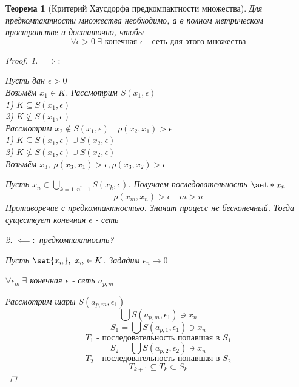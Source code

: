 \documentclass[a4paper]{article}
\DeclarePairedDelimiter\set\{\}
\newtheorem*{theorem}{Теорема}
\theoremstyle{definition}
\theoremstyle{remark}
\begin{document}
\begin{tcolorbox}[enhanced,breakable,skin first=enhanced,skin middle=enhanced,skin last=enhanced]
    \begin{theorem}[Критерий Хаусдорфа предкомпактности множества]
        Для предкомпактности множества необходимо, а в полном метрическом
        пространстве и достаточно, чтобы
        \[
            \forall \epsilon > 0 \ \exists \text{ конечная } \epsilon \text{ - сеть
            для этого множества}
        \]

        \begin{proof}
            1. $ \implies: $ 

            Пусть дан $ \epsilon > 0 $\\
            Возьмём $ x_1 \in K $. Рассмотрим $ S(x_1, \epsilon) $\\
            1) $ K \subseteq S(x_1, \epsilon) $\\
            2) $ K \not\subseteq S(x_1, \epsilon) $\\
            Рассмотрим $ x_2 \notin S(x_1, \epsilon) \quad \rho(x_2, x_1) > \epsilon $\\
            1) $ K \subseteq S(x_1, \epsilon) \cup S(x_2, \epsilon) $ \\
            2) $ K \not\subseteq S(x_1, \epsilon) \cup S(x_2, \epsilon) $ \\
            Возьмём $ x_3, \ \rho(x_3, x_1) > \epsilon, \rho(x_3, x_2) > \epsilon $

            Пусть $ x_n \in \bigcup_{k=\overline{1, n-1}} S(x_k, \epsilon) $.
            Получаем последовательность $ \set*{x_n} $ 
            \[
                \rho(x_m, x_n) > \epsilon \quad m > n
            \]
            Противоречие с предкомпактностью. Значит процесс не бесконечный.
            Тогда существует конечная $ \epsilon $ - сеть

            2. $ \impliedby: $ предкомпактность? 

            Пусть $ \set{x_n}, \ x_n \in K $. Зададим $ \epsilon_n \to 0 $  

            $ \forall \epsilon_m \ \exists $ конечная $ \epsilon $ - сеть $ a_{p,m} $ 

            Рассмотрим шары $ S(a_{p,m}, \epsilon_1) $ 
            \[
                \bigcup S(a_{p,m}, \epsilon_1) \ni x_n
            \]
            \[
                S_1 = \bigcup S(a_{p,1}, \epsilon_1) \ni x_n 
            \] 
            \[
                T_1 \text{ - последовательность попавшая в } S_1
            \]
            \[
                S_2 = \bigcup S(a_{p,2}, \epsilon_2) \ni x_n 
            \] 
            \[
                T_2 \text{ - последовательность попавшая в } S_2
            \]
            \[
                T_{k+1} \subseteq T_k \subset S_k
            \]


\end{proof}
\end{theorem}
\end{tcolorbox}
\end{document}
